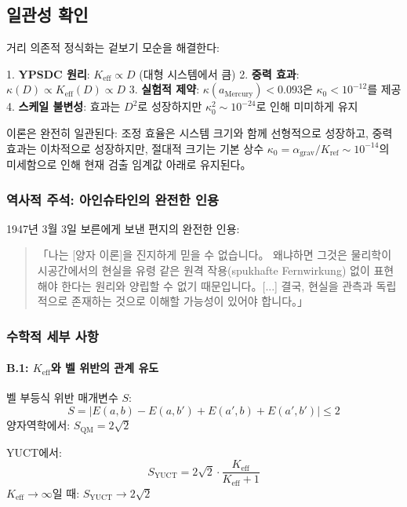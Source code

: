 \documentclass[11pt,a4paper]{article}
\begin{document}
\subsection{일관성 확인}

거리 의존적 정식화는 겉보기 모순을 해결한다:

1. \textbf{YPSDC 원리}: $K_{\mathrm{eff}} \propto D$ (대형 시스템에서 큼)
2. \textbf{중력 효과}: $\kappa(D) \propto K_{\mathrm{eff}}(D) \propto D$
3. \textbf{실험적 제약}: $\kappa(a_{\text{Mercury}}) < 0.093$은 $\kappa_0 < 10^{-12}$를 제공
4. \textbf{스케일 불변성}: 효과는 $D^2$로 성장하지만 $\kappa_0^2 \sim 10^{-24}$로 인해 미미하게 유지

이론은 완전히 일관된다: 조정 효율은 시스템 크기와 함께 선형적으로 성장하고, 중력 효과는 이차적으로 성장하지만, 절대적 크기는 기본 상수 $\kappa_0 = \alpha_{\text{grav}}/K_{\text{ref}} \sim 10^{-14}$의 미세함으로 인해 현재 검출 임계값 아래로 유지된다。

\subsubsection*{역사적 주석: 아인슈타인의 완전한 인용}
1947년 3월 3일 보른에게 보낸 편지의 완전한 인용:

\begin{quote}
「나는 [양자 이론]을 진지하게 믿을 수 없습니다。 왜냐하면 그것은 물리학이 시공간에서의 현실을 유령 같은 원격 작용(spukhafte Fernwirkung) 없이 표현해야 한다는 원리와 양립할 수 없기 때문입니다。[...] 결국, 현실을 관측과 독립적으로 존재하는 것으로 이해할 가능성이 있어야 합니다。」
\end{quote}

\subsubsection*{수학적 세부 사항}

\paragraph{B.1: $K_{\mathrm{eff}}$와 벨 위반의 관계 유도}
벨 부등식 위반 매개변수 $S$:
\begin{equation}
S = |E(a,b) - E(a,b') + E(a',b) + E(a',b')| \leq 2
\end{equation}
양자역학에서: $S_{\text{QM}} = 2\sqrt{2}$

YUCT에서:
\begin{equation}
S_{\text{YUCT}} = 2\sqrt{2} \cdot \frac{K_{\mathrm{eff}}}{K_{\mathrm{eff}} + 1}
\end{equation}
$K_{\mathrm{eff}} \to \infty$일 때: $S_{\text{YUCT}} \to 2\sqrt{2}$
\end{document}
